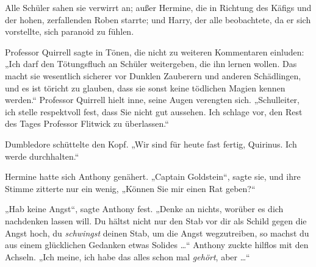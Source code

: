 Alle Schüler sahen sie verwirrt an; außer Hermine, die in Richtung des Käfigs und der hohen, zerfallenden Roben starrte; und Harry, der alle beobachtete, da er sich vorstellte, sich paranoid zu fühlen.

Professor Quirrell sagte in Tönen, die nicht zu weiteren Kommentaren einluden:
„Ich darf den Tötungsfluch an Schüler weitergeben, die ihn lernen wollen. Das macht sie wesentlich sicherer vor Dunklen Zauberern und anderen Schädlingen, und es ist töricht zu glauben, dass sie sonst keine tödlichen Magien kennen werden.“ Professor Quirrell hielt inne, seine Augen verengten sich.
„Schulleiter, ich stelle respektvoll fest, dass Sie nicht gut aussehen. Ich schlage vor, den Rest des Tages Professor Flitwick zu überlassen.“

Dumbledore schüttelte den Kopf.
„Wir sind für heute fast fertig, Quirinus. Ich werde durchhalten.“

Hermine hatte sich Anthony genähert.
„Captain Goldstein“, sagte sie, und ihre Stimme zitterte nur ein wenig,
„Können Sie mir einen Rat geben?“

„Hab keine Angst“, sagte Anthony fest.
„Denke an nichts, worüber es dich nachdenken lassen will. Du hältst nicht nur den Stab vor dir als Schild gegen die Angst hoch, du \emph{schwingst} deinen Stab, um die Angst wegzutreiben, so machst du aus einem glücklichen Gedanken etwas Solides …“ Anthony zuckte hilflos mit den Achseln.
„Ich meine, ich habe das alles schon mal \emph{gehört}, aber …“

